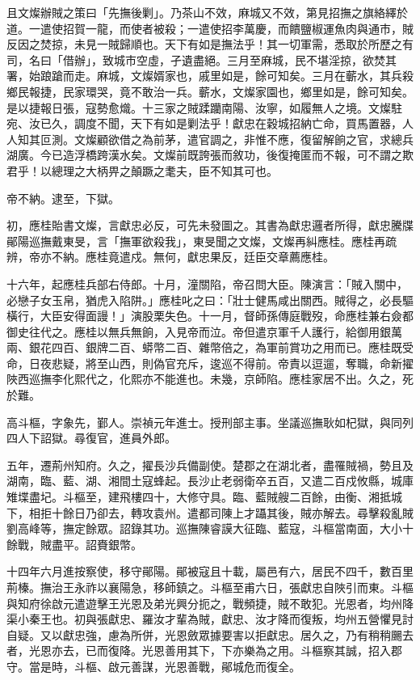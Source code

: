 \begin{pinyinscope}
且文燦辦賊之策曰「先撫後剿」。乃茶山不效，麻城又不效，第見招撫之旗絡繹於道。一遣使招賀一龍，而使者被殺；一遣使招李萬慶，而饋鹽椒運魚肉與通市，賊反因之焚掠，未見一賊歸順也。天下有如是撫法乎！其一切軍需，悉取於所歷之有司，名曰「借辦」，致城市空虛，孑遺盡絕。三月至麻城，民不堪淫掠，欲焚其署，始踉蹌而走。麻城，文燦婿家也，戚里如是，餘可知矣。三月在蘄水，其兵殺鄉民報捷，民家環哭，竟不敢治一兵。蘄水，文燦家園也，鄉里如是，餘可知矣。是以捷報日張，寇勢愈熾。十三家之賊蹂躪南陽、汝寧，如履無人之境。文燦駐宛、汝已久，調度不聞，天下有如是剿法乎！獻忠在穀城招納亡命，買馬置器，人人知其叵測。文燦顧欲借之為前茅，遣官調之，非惟不應，復留解餉之官，求總兵湖廣。今已造浮橋跨漢水矣。文燦前既誇張而敘功，後復掩匿而不報，可不謂之欺君乎！以總理之大柄畀之顛蹶之耄夫，臣不知其可也。

帝不納。逮至，下獄。

初，應桂貽書文燦，言獻忠必反，可先未發圖之。其書為獻忠邏者所得，獻忠騰牒鄖陽巡撫戴東旻，言「撫軍欲殺我」，東旻聞之文燦，文燦再糾應桂。應桂再疏辨，帝亦不納。應桂竟遣戍。無何，獻忠果反，廷臣交章薦應桂。

十六年，起應桂兵部右侍郎。十月，潼關陷，帝召問大臣。陳演言：「賊入關中，必戀子女玉帛，猶虎入陷阱。」應桂叱之曰：「壯士健馬咸出關西。賊得之，必長驅橫行，大臣安得面謾！」演股栗失色。十一月，督師孫傳庭戰歿，命應桂兼右僉都御史往代之。應桂以無兵無餉，入見帝而泣。帝但遣京軍千人護行，給御用銀萬兩、銀花四百、銀牌二百、蟒幣二百、雜幣倍之，為軍前賞功之用而已。應桂既受命，日夜悲疑，將至山西，則偽官充斥，逡巡不得前。帝責以逗遛，奪職，命新擢陜西巡撫李化熙代之，化熙亦不能進也。未幾，京師陷。應桂家居不出。久之，死於難。

高斗樞，字象先，鄞人。崇禎元年進士。授刑部主事。坐議巡撫耿如杞獄，與同列四人下詔獄。尋復官，進員外郎。

五年，遷荊州知府。久之，擢長沙兵備副使。楚郡之在湖北者，盡罹賊禍，勢且及湖南，臨、藍、湖、湘間土寇蜂起。長沙止老弱衛卒五百，又遣二百戍攸縣，城庫雉堞盡圮。斗樞至，建飛樓四十，大修守具。臨、藍賊艘二百餘，由衡、湘抵城下，相拒十餘日乃卻去，轉攻袁州。遣都司陳上才躡其後，賊亦解去。尋擊殺亂賊劉高峰等，撫定餘眾。詔錄其功。巡撫陳睿謨大征臨、藍寇，斗樞當南面，大小十餘戰，賊盡平。詔賚銀幣。

十四年六月進按察使，移守鄖陽。鄖被寇且十載，屬邑有六，居民不四千，數百里荊榛。撫治王永祚以襄陽急，移師鎮之。斗樞至甫六日，張獻忠自陜引而東。斗樞與知府徐啟元遣遊擊王光恩及弟光興分扼之，戰頻捷，賊不敢犯。光恩者，均州降渠小秦王也。初與張獻忠、羅汝才輩為賊，獻忠、汝才降而復叛，均州五營懼見討自疑。又以獻忠強，慮為所併，光恩斂眾據要害以拒獻忠。居久之，乃有稍稍颺去者，光恩亦去，已而復降。光恩善用其下，下亦樂為之用。斗樞察其誠，招入郡守。當是時，斗樞、啟元善謀，光恩善戰，鄖城危而復全。


\end{pinyinscope}
